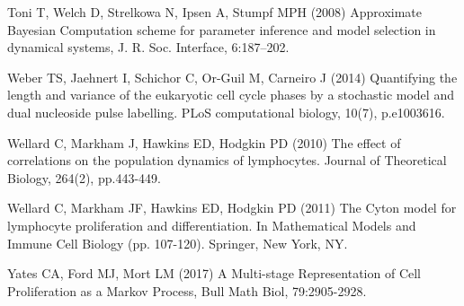 \documentclass[10pt]{article}
\numberwithin{equation}{section}
\begin{document}
\begin{thebibliography}{}
Toni T, Welch D, Strelkowa N, Ipsen A, Stumpf MPH (2008) Approximate Bayesian Computation scheme for parameter inference and model selection in dynamical systems, J. R. Soc. Interface, 6:187–202.


Weber TS, Jaehnert I, Schichor C, Or-Guil M, Carneiro J (2014) Quantifying the length and variance of the eukaryotic cell cycle phases by a stochastic model and dual nucleoside pulse labelling. PLoS computational biology, 10(7), p.e1003616.

Wellard C, Markham J, Hawkins ED, Hodgkin PD (2010) The effect of correlations on the population dynamics of lymphocytes. Journal of Theoretical Biology, 264(2), pp.443-449.

Wellard C, Markham JF, Hawkins ED, Hodgkin PD (2011) The Cyton model for lymphocyte proliferation and differentiation. In Mathematical Models and Immune Cell Biology (pp. 107-120). Springer, New York, NY.

Yates CA, Ford MJ, Mort LM (2017) A Multi-stage Representation of Cell Proliferation as a Markov Process, Bull Math Biol, 79:2905-2928.


\end{thebibliography}
\end{document}
